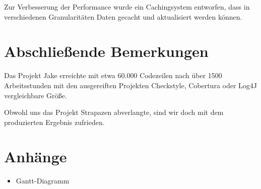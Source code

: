 Zur Verbesserung der Performance wurde ein Cachingsystem entworfen, dass in verschiedenen Granularitäten Daten gecacht und aktualisiert werden können.


\section{Abschließende Bemerkungen}
Das Projekt Jake erreichte mit etwa 60.000 Codezeilen nach über 1500 Arbeitsstunden mit den ausgereiften Projekten Checkstyle, Cobertura oder Log4J vergleichbare Größe.

Obwohl uns das Projekt Strapazen abverlangte, sind wir doch mit dem produzierten Ergebnis zufrieden.

\section{Anhänge}
\begin{itemize}
\item Gantt-Diagramm
\end{itemize}


